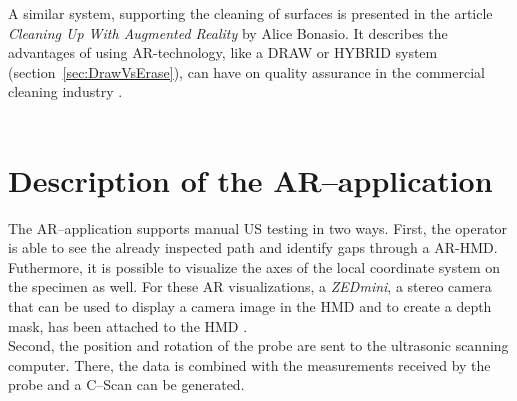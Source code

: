 \documentclass{VRARWorkshop}
\begin{document}
A similar system, supporting the cleaning of surfaces is presented in the article \textit{Cleaning Up With Augmented Reality} by Alice Bonasio.
It describes the advantages of using AR-technology, like a DRAW or HYBRID system (section~\ref{sec:DrawVsErase}), can have on quality assurance in the commercial cleaning industry \cite{ARClean}.\\

\cite{fadzil_design_2015}\\


\section{Description of the AR--application}
The AR--application supports manual US testing in two ways. First, 
the operator is able to see the already inspected path and identify gaps through a AR-HMD. 
Futhermore, it is possible to visualize the axes of the local coordinate system on the specimen as well.
For these AR visualizations, a \textit{ZEDmini}, a stereo camera that can be used to display a camera image in the HMD and to create a depth mask, has been attached to the HMD \cite{dorner_virtual_2013}. \\
Second, the position and rotation of the probe are sent to the ultrasonic scanning computer.
There, the data is combined with the measurements received by the probe and a C--Scan can be 
generated.
\end{document}
